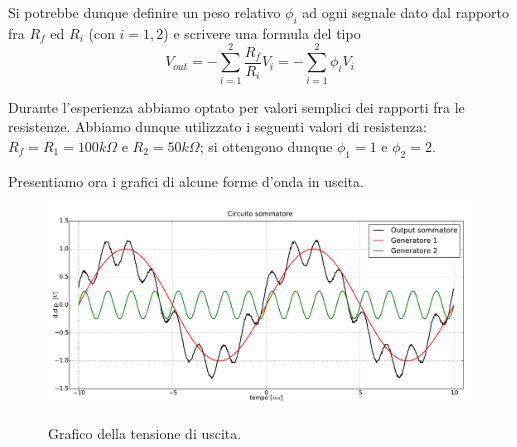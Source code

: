 \documentclass {article}
\begin{document}
Si potrebbe dunque definire un peso relativo $\phi_i$ ad ogni segnale dato dal rapporto fra $R_f$ ed $R_{i}$ (con $i=1,2$) e scrivere una formula del tipo
$$V_{out}=-\sum^{2}_{i=1} \frac{R_f}{R_{i}}V_{i}=-\sum^{2}_{i=1} \phi_i V_{i}$$

Durante l'esperienza abbiamo optato per valori semplici dei rapporti fra le resistenze. Abbiamo dunque utilizzato i seguenti valori di resistenza: $R_f=R_1=100 k\Omega$ e $R_2=50 k\Omega$; si ottengono dunque $\phi_1=1$ e $\phi_2=2$.

Presentiamo ora i grafici di alcune forme d'onda in uscita.

\begin{figure}[ht]
 \centering
   {\includegraphics[width=20cm]{sinsin.pdf}}
 \caption{Grafico della tensione di uscita.}
 \label{gr:costante}
\end{figure}
\end{document}
